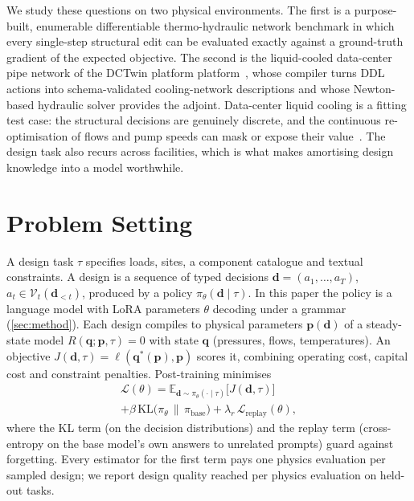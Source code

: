 \documentclass[journal]{IEEEtran}
\newif\ifblindreview
\newcommand{\platform}{\ifblindreview a production data-centre digital-twin platform\else the DCTwin platform\fi}
\newcommand{\ddl}{DDL}
\newcommand{\Jobj}{J}
\newcommand{\design}{\bm{d}}
\newcommand{\task}{\tau}
\newcommand{\E}{\mathbb{E}}
\begin{document}
We study these questions on two physical environments.  The first is a
purpose-built, enumerable differentiable thermo-hydraulic network benchmark in
which every single-step structural edit can be evaluated exactly against a
ground-truth gradient of the expected objective.  The second is the
liquid-cooled data-center pipe network of \platform
platform~\cite{li2026dctwin}, whose compiler turns \ddl{} actions into
schema-validated cooling-network descriptions and whose Newton-based hydraulic
solver provides the adjoint.  Data-center liquid cooling is a fitting test case:
the structural decisions are genuinely discrete, and the continuous
re-optimisation of flows and pump speeds can mask or expose their
value~\cite{jadhav2026codesign}.  The design task also recurs across facilities,
which is what makes amortising design knowledge into a model worthwhile.





\FloatBarrier
\section{Problem Setting}
\label{sec:problem}

A design task $\task$ specifies loads, sites, a component catalogue and
textual constraints.  A design is a sequence of typed decisions
$\design=(a_1,\dots,a_T)$, $a_t\in\mathcal V_t(\design_{<t})$, produced by a
policy $\pi_\theta(\design\mid\task)$.  In this paper the policy is a language
model with LoRA parameters $\theta$ decoding under a grammar (\cref{sec:method}).
Each design compiles to physical parameters $\bm p(\design)$ of a steady-state model
$R(\bm q;\bm p,\task)=0$ with state $\bm q$ (pressures, flows, temperatures).  An
objective $\Jobj(\design,\task)=\ell(\bm q^*(\bm p),\bm p)$ scores it, combining
operating cost, capital cost and constraint penalties.  Post-training minimises
\begin{multline}
  \mathcal L(\theta)=\E_{\design\sim\pi_\theta(\cdot\mid\task)}\big[\Jobj(\design,\task)\big] \\
  +\beta\,\mathrm{KL}\big(\pi_\theta\,\|\,\pi_{\mathrm{base}}\big)
  +\lambda_r\,\mathcal L_{\mathrm{replay}}(\theta),
  \label{eq:objective}
\end{multline}
where the KL term (on the decision distributions) and the replay term
(cross-entropy on the base model's own answers to unrelated prompts) guard
against forgetting.  Every estimator for the first term pays one physics
evaluation per sampled design; we report design quality reached per physics
evaluation on held-out tasks.
\end{document}
